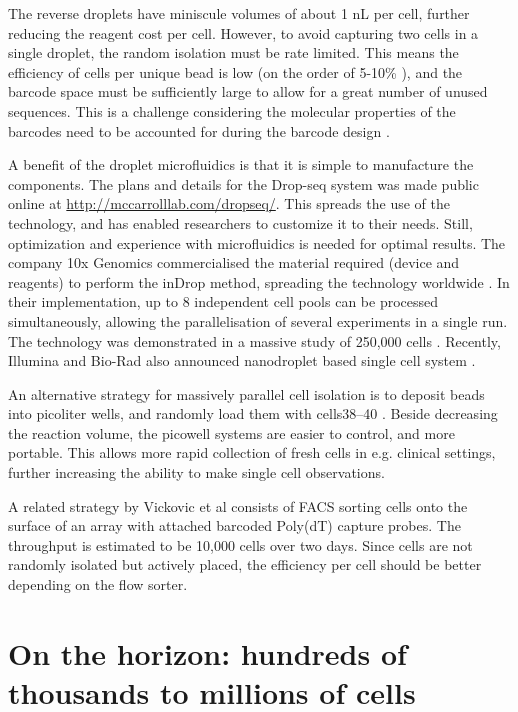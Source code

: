 The reverse droplets have miniscule volumes of about 1 nL per cell, further reducing the
reagent cost per cell. However, to avoid capturing two cells in a single droplet, the random
isolation must be rate limited. This means the efficiency of cells per unique bead is low (on
the order of 5-10\% \cite{Klein2015-ti, Macosko2015-jb}), and the barcode space must be sufficiently large to allow for a great number of unused sequences. This is a challenge considering the molecular properties of the barcodes need to be accounted for during the barcode design \cite{Costea2013-oj}.

A benefit of the droplet microfluidics is that it is simple to manufacture the components. The plans and details for the Drop-seq system was made public online at \url{http://mccarrolllab.com/dropseq/}. This spreads the use of the technology, and has enabled researchers to customize it to their needs. Still, optimization and experience with microfluidics is needed for optimal results. The company 10x Genomics commercialised the material required (device and reagents) to perform the inDrop method, spreading the technology worldwide \cite{10x_Genomics_Inc2016-do}. In their implementation, up to 8 independent cell pools can be processed simultaneously, allowing the parallelisation of several experiments in a single run. The technology was demonstrated in a massive study of 250,000 cells \cite{Zheng2017-th}. Recently, Illumina and Bio-Rad also announced nanodroplet based single cell system \cite{Illumina_Inc2017-wj}.

An alternative strategy for massively parallel cell isolation is to deposit beads into picoliter
wells, and randomly load them with cells38–40 \cite{Christina_Fan2015-dy, Gierahn2017-xv, Bose2015-dt}. Beside decreasing the reaction volume, the picowell systems are easier to control, and more portable. This allows more rapid collection
of fresh cells in e.g. clinical settings, further increasing the ability to make single cell observations.

A related strategy by Vickovic et al \cite{Vickovic2016-or} consists of FACS sorting cells onto the surface of an
array with attached barcoded Poly(dT) capture probes. The throughput is estimated to be 10,000 cells over two days. Since cells are not randomly isolated but actively placed, the efficiency per cell should be better depending on the flow sorter.

\section{On the horizon: hundreds of thousands to millions of cells}

